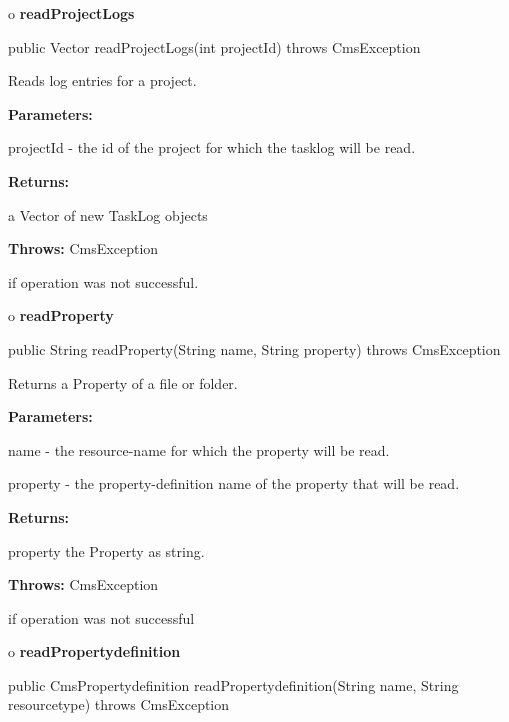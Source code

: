 o {\bf readProjectLogs}

\begin{PRE}
 public Vector readProjectLogs(int projectId) throws CmsException
\end{PRE}

\begin{description}
\htmlDD Reads log entries for a project.

\begin{description}
\item {\bf Parameters:}

projectId - the id of the project for which the tasklog will be read.
\item {\bf Returns:}

a Vector of new TaskLog objects
\item {\bf Throws:} CmsException

if operation was not successful.
\end{description}

\end{description}

o {\bf readProperty}

\begin{PRE}
 public String readProperty(String name,
                            String property) throws CmsException
\end{PRE}

\begin{description}
\htmlDD Returns a Property of a file or folder.

\begin{description}
\item {\bf Parameters:}

name - the resource-name for which the property will be read.

property - the property-definition name of the property that will be read.
\item {\bf Returns:}

property the Property as string.
\item {\bf Throws:} CmsException

if operation was not successful
\end{description}

\end{description}

o {\bf readPropertydefinition}

\begin{PRE}
 public CmsPropertydefinition readPropertydefinition(String name,
                                                     String resourcetype) throws CmsException
\end{PRE}

